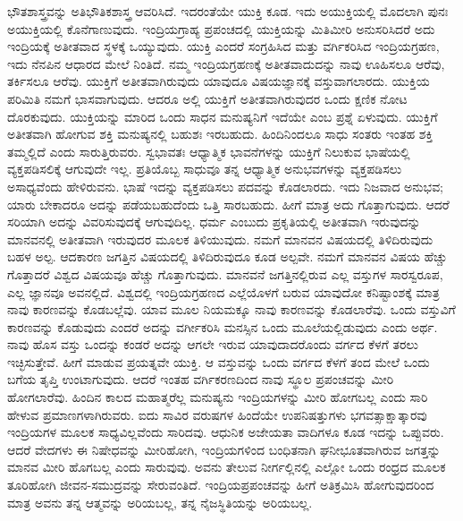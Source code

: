 ಭೌತಶಾಸ್ತ್ರವನ್ನು ಅತಿಭೌತಿಕಶಾಸ್ತ್ರ ಆವರಿಸಿದೆ. ಇದರಂತೆಯೇ ಯುಕ್ತಿ ಕೂಡ. ಇದು ಅಯುಕ್ತಿಯಲ್ಲಿ ಮೊದಲಾಗಿ ಪುನಃ ಅಯುಕ್ತಿಯಲ್ಲಿ ಕೊನೆಗಾಣುವುದು. ಇಂದ್ರಿಯಗ್ರಾಹ್ಯ ಪ್ರಪಂಚದಲ್ಲಿ ಯುಕ್ತಿಯನ್ನು ಮಿತಿಮೀರಿ ಅನುಸರಿಸಿದರೆ ಅದು ಇಂದ್ರಿಯಕ್ಕೆ ಅತೀತವಾದ ಸ್ಥಳಕ್ಕೆ ಒಯ್ಯುವುದು. ಯುಕ್ತಿ ಎಂದರೆ ಸಂಗ್ರಹಿಸಿದ ಮತ್ತು ವರ್ಗಿಕರಿಸಿದ ಇಂದ್ರಿಯಗ್ರಹಣ, ಇದು ನೆನಪಿನ ಆಧಾರದ ಮೇಲೆ ನಿಂತಿದೆ. ನಮ್ಮ ಇಂದ್ರಿಯಗ್ರಹಣಕ್ಕೆ ಅತೀತವಾದುದನ್ನು ನಾವು ಊಹಿಸಲೂ ಆರೆವು, ತರ್ಕಿಸಲೂ ಆರೆವು. ಯುಕ್ತಿಗೆ ಅತೀತವಾಗಿರುವುದು ಯಾವುದೂ ವಿಷಯಜ್ಞಾನಕ್ಕೆ ವಸ್ತುವಾಗಲಾರದು. ಯುಕ್ತಿಯ ಪರಿಮಿತಿ ನಮಗೆ ಭಾಸವಾಗುವುದು. ಆದರೂ ಅಲ್ಲಿ ಯುಕ್ತಿಗೆ ಅತೀತವಾಗಿರುವುದರ ಒಂದು ಕ್ಷಣಿಕ ನೋಟ ದೊರಕುವುದು. ಯುಕ್ತಿಯನ್ನು ಮಾರಿದ ಒಂದು ಸಾಧನ ಮನುಷ್ಯನಿಗೆ ಇದೆಯೇ ಎಂಬ ಪ್ರಶ್ನೆ ಏಳುವುದು. ಯುಕ್ತಿಗೆ ಅತೀತವಾಗಿ ಹೋಗುವ ಶಕ್ತಿ ಮನುಷ್ಯನಲ್ಲಿ ಬಹುಶಃ ಇರಬಹುದು. ಹಿಂದಿನಿಂದಲೂ ಸಾಧು ಸಂತರು ಇಂತಹ ಶಕ್ತಿ ತಮ್ಮಲ್ಲಿದೆ ಎಂದು ಸಾರುತ್ತಿರುವರು. ಸ್ವಭಾವತಃ ಆಧ್ಯಾತ್ಮಿಕ ಭಾವನೆಗಳನ್ನು ಯುಕ್ತಿಗೆ ನಿಲುಕುವ ಭಾಷೆಯಲ್ಲಿ ವ್ಯಕ್ತಪಡಿಸಲಿಕ್ಕೆ ಆಗುವುದೇ ಇಲ್ಲ. ಪ್ರತಿಯೊಬ್ಬ ಸಾಧುವೂ ತನ್ನ ಆಧ್ಯಾತ್ಮಿಕ ಅನುಭವಗಳನ್ನು ವ್ಯಕ್ತಪಡಿಸಲು ಅಸಾಧ್ಯವೆಂದು ಹೇಳಿರುವನು. ಭಾಷೆ ಇದನ್ನು ವ್ಯಕ್ತಪಡಿಸಲು ಪದವನ್ನು ಕೊಡಲಾರದು. ಇದು ನಿಜವಾದ ಅನುಭವ; ಯಾರು ಬೇಕಾದರೂ ಅದನ್ನು ಪಡೆಯಬಹುದೆಂದು ಒತ್ತಿ ಸಾರಬಹುದು. ಹೀಗೆ ಮಾತ್ರ ಅದು ಗೊತ್ತಾಗುವುದು. ಆದರೆ ಸರಿಯಾಗಿ ಅದನ್ನು ವಿವರಿಸುವುದಕ್ಕೆ ಆಗುವುದಿಲ್ಲ. ಧರ್ಮ ಎಂಬುದು ಪ್ರಕೃತಿಯಲ್ಲಿ ಅತೀತವಾಗಿ ಇರುವುದನ್ನು ಮಾನವನಲ್ಲಿ ಅತೀತವಾಗಿ ಇರುವುದರ ಮೂಲಕ ತಿಳಿಯುವುದು. ನಮಗೆ ಮಾನವನ ವಿಷಯದಲ್ಲಿ ತಿಳಿದಿರುವುದು ಬಹಳ ಅಲ್ಪ. ಆದಕಾರಣ ಜಗತ್ತಿನ ವಿಷಯದಲ್ಲಿ ತಿಳಿದಿರುವುದೂ ಕೂಡ ಅಲ್ಪವೇ. ನಮಗೆ ಮಾನವನ ವಿಷಯ ಹೆಚ್ಚು ಗೊತ್ತಾದರೆ ವಿಶ್ವದ ವಿಷಯವೂ ಹೆಚ್ಚು ಗೊತ್ತಾಗುವುದು. ಮಾನವನೆ ಜಗತ್ತಿನಲ್ಲಿರುವ ಎಲ್ಲ ವಸ್ತುಗಳ ಸಾರಸ್ವರೂಪ, ಎಲ್ಲ ಜ್ಞಾನವೂ ಅವನಲ್ಲಿದೆ. ವಿಶ್ವದಲ್ಲಿ ಇಂದ್ರಿಯಗ್ರಹಣದ ಎಲ್ಲೆಯೊಳಗೆ ಬರುವ ಯಾವುದೋ ಕನಿಷ್ಟಾಂಶಕ್ಕೆ ಮಾತ್ರ ನಾವು ಕಾರಣವನ್ನು ಕೊಡಬಲ್ಲೆವು. ಯಾವ ಮೂಲ ನಿಯಮಕ್ಕೂ ನಾವು ಕಾರಣವನ್ನು ಕೊಡಲಾರೆವು. ಒಂದು ವಸ್ತುವಿಗೆ ಕಾರಣವನ್ನು ಕೊಡುವುದು ಎಂದರೆ ಅದನ್ನು ವರ್ಗೀಕರಿಸಿ ಮನಸ್ಸಿನ ಒಂದು ಮೂಲೆಯಲ್ಲಿಡುವುದು ಎಂದು ಅರ್ಥ. ನಾವು ಹೊಸ ವಸ್ತು ಒಂದನ್ನು ಕಂಡರೆ ಅದನ್ನು ಆಗಲೇ ಇರುವ ಯಾವುದಾದರೊಂದು ವರ್ಗದ ಕೆಳಗೆ ತರಲು ಇಚ್ಛಿಸುತ್ತೇವೆ. ಹೀಗೆ ಮಾಡುವ ಪ್ರಯತ್ನವೇ ಯುಕ್ತಿ. ಆ ವಸ್ತುವನ್ನು ಒಂದು ವರ್ಗದ ಕೆಳಗೆ ತಂದ ಮೇಲೆ ಒಂದು ಬಗೆಯ ತೃಪ್ತಿ ಉಂಟಾಗುವುದು. ಆದರೆ ಇಂತಹ ವರ್ಗಿಕರಣದಿಂದ ನಾವು ಸ್ಥೂಲ ಪ್ರಪಂಚವನ್ನು ಮೀರಿ ಹೋಗಲಾರೆವು. ಹಿಂದಿನ ಕಾಲದ ಮಹಾತ್ಮರೆಲ್ಲ ಮನುಷ್ಯನು ಇಂದ್ರಿಯಗಳನ್ನು ಮೀರಿ ಹೋಗಬಲ್ಲ ಎಂದು ಸಾರಿ ಹೇಳುವ ಪ್ರಮಾಣಗಳಾಗಿರುವರು. ಐದು ಸಾವಿರ ವರುಷಗಳ ಹಿಂದೆಯೇ ಉಪನಿಷತ್ತುಗಳು ಭಗವತ್ಸಾಕ್ಷಾತ್ಕಾರವು ಇಂದ್ರಿಯಗಳ ಮೂಲಕ ಸಾಧ್ಯವಿಲ್ಲವೆಂದು ಸಾರಿದವು. ಆಧುನಿಕ ಅಜೇಯತಾ ವಾದಿಗಳೂ ಕೂಡ ಇದನ್ನು ಒಪ್ಪುವರು. ಆದರೆ ವೇದಗಳು ಈ ನಿಷೇಧವನ್ನು ಮೀರಿಹೋಗಿ, ಇಂದ್ರಿಯಗಳಿಂದ ಬಂಧಿತನಾಗಿ ಘನೀಭೂತವಾಗಿರುವ ಜಗತ್ತನ್ನು ಮಾನವ ಮೀರಿ ಹೊಗಬಲ್ಲ ಎಂದು ಸಾರುವುವು. ಅವನು ತೇಲುವ ನೀರ್ಗಲ್ಲಿನಲ್ಲಿ ಎಲ್ಲೋ ಒಂದು ರಂಧ್ರದ ಮೂಲಕ ತೂರಿಹೋಗಿ ಜೀವನ-ಸಮುದ್ರವನ್ನು ಸೇರುವಂತಿದೆ. ಇಂದ್ರಿಯಪ್ರಪಂಚವನ್ನು ಹೀಗೆ ಅತಿಕ್ರಮಿಸಿ ಹೋಗುವುದರಿಂದ ಮಾತ್ರ ಅವನು ತನ್ನ ಆತ್ಮವನ್ನು ಅರಿಯಬಲ್ಲ, ತನ್ನ ನೈಜಸ್ಥಿತಿಯನ್ನು ಅರಿಯಬಲ್ಲ.


